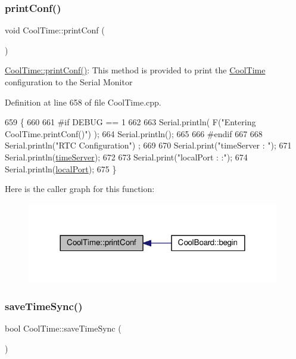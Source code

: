 \subsubsection{\texorpdfstring{print\+Conf()}{printConf()}}
{\footnotesize\ttfamily void Cool\+Time\+::print\+Conf (\begin{DoxyParamCaption}{ }\end{DoxyParamCaption})}

\hyperlink{class_cool_time_af355e7f9b3898211cd2ff25eab5933b1}{Cool\+Time\+::print\+Conf()}\+: This method is provided to print the \hyperlink{class_cool_time}{Cool\+Time} configuration to the Serial Monitor 

Definition at line 658 of file Cool\+Time.\+cpp.


\begin{DoxyCode}
659 \{
660 
661 \textcolor{preprocessor}{#if DEBUG == 1}
662 
663     Serial.println( F(\textcolor{stringliteral}{"Entering CoolTime.printConf()"}) );
664     Serial.println();
665 
666 \textcolor{preprocessor}{#endif }
667 
668     Serial.println(\textcolor{stringliteral}{"RTC Configuration"}) ;
669 
670     Serial.print(\textcolor{stringliteral}{"timeServer : "});
671     Serial.println(\hyperlink{class_cool_time_ad2b9858f399108cb440dd1e908916f04}{timeServer});
672     
673     Serial.print(\textcolor{stringliteral}{"localPort : :"});
674     Serial.println(\hyperlink{class_cool_time_a2f777da44d7ba678be8185299e9b49d1}{localPort});
675 \}
\end{DoxyCode}
Here is the caller graph for this function\+:\nopagebreak
\begin{figure}[H]
\begin{center}
\leavevmode
\includegraphics[width=312pt]{d6/d49/class_cool_time_af355e7f9b3898211cd2ff25eab5933b1_icgraph}
\end{center}
\end{figure}
\mbox{\label{class_cool_time_ae9658c9b377510d469e3b88edf33ee85}} 
\subsubsection{\texorpdfstring{save\+Time\+Sync()}{saveTimeSync()}}
{\footnotesize\ttfamily bool Cool\+Time\+::save\+Time\+Sync (\begin{DoxyParamCaption}{ }\end{DoxyParamCaption})}

